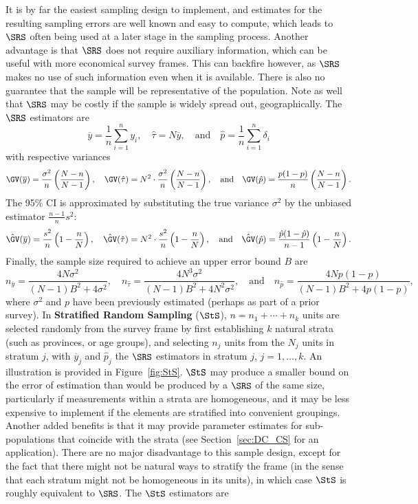 \afterpage{\FloatBarrier}
It is by far the easiest sampling design to implement, and estimates for the resulting sampling errors are well known and easy to compute, which leads to $\SRS$ often being used at a later stage in the sampling process. 
Another advantage is that $\SRS$ does not require auxiliary information, which can be useful with more economical survey frames. \newl This can backfire however, as $\SRS$ makes no use of such information even when it is available. There is also no guarantee that the sample will be representative of the population. Note as well that $\SRS$ may be costly if the sample is widely spread out, geographically.\newl 
The $\SRS$ estimators are 
$$\overline{y}=\frac{1}{n}\sum_{i=1}^n y_i, \quad \hat{\tau}=N\overline{y}, \quad\mbox{and}\quad \hat{p}=\frac{1}{n}\sum_{i=1}^n \delta_i$$ with respective variances
$$\GV(\overline{y})=\frac{\sigma^2}{n}\left(\frac{N-n}{N-1}\right),\quad \GV(\hat{\tau})=N^2\cdot\frac{\sigma^2}{n}\left(\frac{N-n}{N-1}\right),\quad\mbox{and}\quad \GV(\hat{p})=\frac{p(1-p)}{n}\left(\frac{N-n}{N-1}\right).$$
\newpage\noindent The 95\% CI is approximated by substituting the true variance $\sigma^2$ by the unbiased estimator $\frac{n-1}{n}s^2$: $$\hat{\GV}(\overline{y})=\frac{s^2}{n}\left(1-\frac{n}{N}\right), \quad
\hat{\GV}(\hat{\tau})=N^2\cdot\frac{s^2}{n}\left(1-\frac{n}{N}\right), \quad\mbox{and}\quad 
\hat{\GV}(\hat{p})=\frac{\hat{p}(1-\hat{p})}{n-1}\left(1-\frac{n}{N}\right).$$
Finally, the sample size required to achieve an upper error bound $B$ are $$n_{\overline{y}}=\frac{4N\sigma^2}{(N-1)B^2+4\sigma^2},\quad n_{\hat{\tau}}=\frac{4N^3\sigma^2}{(N-1)B^2+4N^2\sigma^2},\quad\mbox{and}\quad n_{\hat{p}}=\frac{4Np(1-p)}{(N-1)B^2+4p(1-p)},$$ where $\sigma^2$ and $p$ have been previously estimated (perhaps as part of a prior survey). \newl 
In \textbf{Stratified Random Sampling} ($\StS$), $n=n_1+\cdots+n_k$ units are selected randomly from the survey frame by first establishing $k$ natural strata (such as provinces, or age groups), and selecting $n_j$ units from the $N_j$ units in stratum $j$, with $\overline{y}_j$ and $\hat{p}_j$ the $\SRS$ estimators in stratum $j$, $j=1,\ldots, k$. An illustration is provided in Figure~\ref{fig:StS}. \newl $\StS$ may produce a smaller bound on the error of estimation than would be produced by a $\SRS$ of the same size, particularly if measurements within a strata are homogeneous, and it may be less expensive to implement if the elements are stratified into convenient groupings. Another added benefits is that it may provide parameter estimates for sub-populations that coincide with the strata (see Section~\ref{sec:DC_CS} for an application). There are no major disadvantage to this sample design, except for the fact that there might not be natural ways to stratify the frame (in the sense that each stratum might not be homogeneous in its units), in which case $\StS$ is roughly equivalent to $\SRS$. \newl The $\StS$ estimators are 
